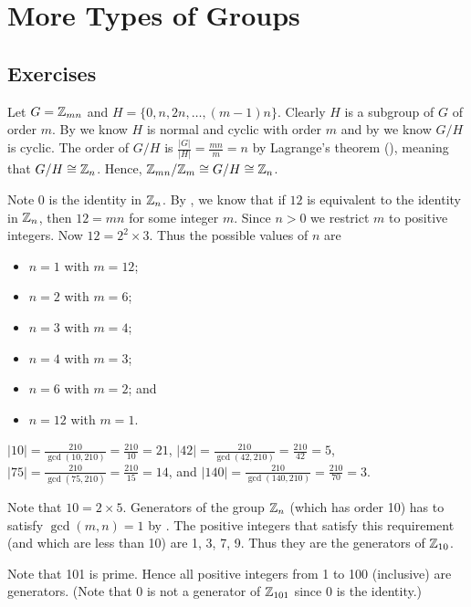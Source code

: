 \section{More Types of Groups}
\subsection*{Exercises}
\begin{questions}
    \item Let $G = \mathbb{Z}_{mn}$ and $H = \{0, n, 2n, \dots, (m-1)n\}$. Clearly $H$ is a subgroup of $G$ of order $m$. By  we know $H$ is normal and cyclic with order $m$ and by  we know $G/H$ is cyclic. The order of $G/H$ is $\frac{|G|}{|H|} = \frac{mn}{m} = n$ by Lagrange's theorem (), meaning that $G/H \cong \mathbb{Z}_n$. Hence, $\mathbb{Z}_{mn}/\mathbb{Z}_m \cong G/H \cong \mathbb{Z}_n$.

    \item Note 0 is the identity in $\mathbb{Z}_n$. By , we know that if $12$ is equivalent to the identity in $\mathbb{Z}_n$, then $12 = mn$ for some integer $m$. Since $n > 0$ we restrict $m$ to positive integers. Now $12 = 2^2 \times 3$. Thus the possible values of $n$ are
    \begin{itemize}
        \item $n = 1$ with $m = 12$;
        \item $n = 2$ with $m = 6$;
        \item $n = 3$ with $m = 4$;
        \item $n = 4$ with $m = 3$;
        \item $n = 6$ with $m = 2$; and
        \item $n = 12$ with $m = 1$.
    \end{itemize}

    \item $|10| = \frac{210}{\gcd(10, 210)} = \frac{210}{10} = 21$, $|42| = \frac{210}{\gcd(42, 210)} = \frac{210}{42} = 5$, $|75| = \frac{210}{\gcd(75, 210)} = \frac{210}{15} = 14$, and $|140| = \frac{210}{\gcd(140, 210)} = \frac{210}{70} = 3$.

    \item \begin{partquestions}{\alph*}
        \item Note that $10 = 2 \times 5$. Generators of the group $\mathbb{Z}_n$ (which has order 10) has to satisfy $\gcd(m,n) = 1$ by . The positive integers that satisfy this requirement (and which are less than 10) are 1, 3, 7, 9. Thus they are the generators of $\mathbb{Z}_{10}$.
        \item Note that 101 is prime. Hence all positive integers from 1 to 100 (inclusive) are generators. (Note that 0 is not a generator of $\mathbb{Z}_{101}$ since 0 is the identity.)
    \end{partquestions}


\end{questions}
